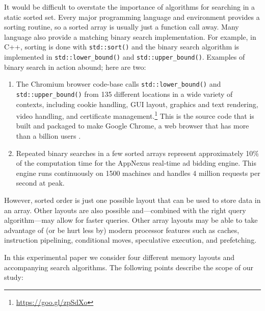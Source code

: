\documentclass{patmorin}
\begin{document}
It would be difficult to overstate the importance of
algorithms for searching in a static sorted set.
Every major programming language and environment provides a sorting
routine, so a sorted array is usually just a function call away. Many
language also provide a matching binary search implementation.
For example, in C++, sorting is done with \texttt{std::sort()}
and the binary search algorithm is implemented in \texttt{std::lower_bound()}
and \texttt{std::upper_bound()}.
Examples of binary search in action abound; here are two:

\begin{enumerate}
\item The Chromium browser code-base
calls \texttt{std::lower_bound()} and
\texttt{std::upper_bound()} from 135 different locations
in a wide variety of contexts, including cookie handling, GUI
layout, graphics and text rendering, video handling, and certificate
management.\footnote{\url{https://goo.gl/zpSdXo}} This is the source code
that is built and packaged to make Google Chrome, a web browser that has more than a billion users \cite{protalinksi:google}.

\item Repeated binary searches in a few sorted arrays
represent approximately 10\% of the computation time for the AppNexus
real-time ad bidding engine. This engine runs continuously on 1500 machines
and handles 4 million requests per second at peak.
\end{enumerate}

However, sorted order is just one possible layout that can be used to
store data in an array. Other layouts are also possible and---combined
with the right query algorithm---may allow for faster queries.
Other array layouts may be able to take advantage of (or be hurt less
by) modern processor features such as caches, instruction pipelining,
conditional moves, speculative execution, and prefetching.

  
In this experimental paper we consider four different memory layouts and
accompanying search algorithms.  The following points describe the scope of our study:
\end{document}
